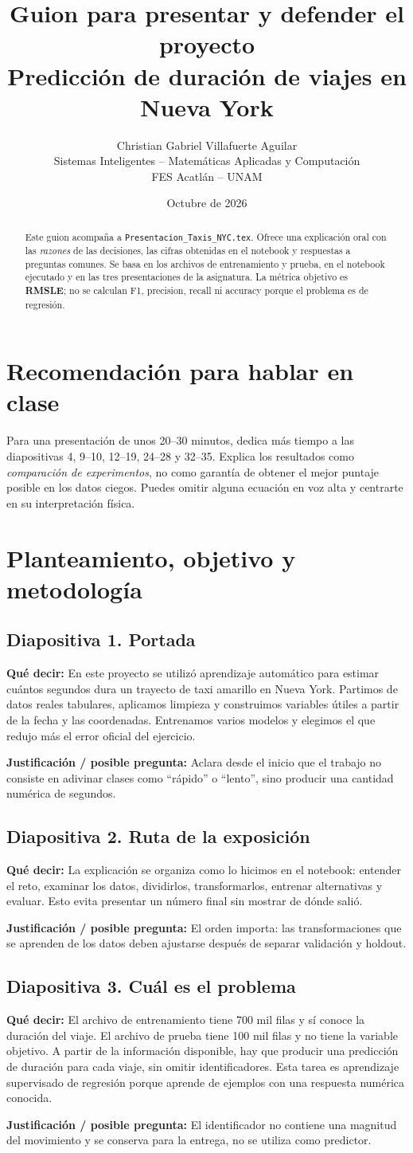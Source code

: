 \documentclass[11pt,letterpaper]{article}
\title{Guion para presentar y defender el proyecto\\[3mm]\large Predicción de duración de viajes en Nueva York}
\author{Christian Gabriel Villafuerte Aguilar\\Sistemas Inteligentes -- Matemáticas Aplicadas y Computación\\FES Acatlán -- UNAM}
\date{Octubre de 2026}
\newcommand{\lamina}[2]{\subsection*{Diapositiva #1. #2}}
\newcommand{\explica}[1]{\noindent\textcolor{azul}{\textbf{Qué decir:}} #1\par\smallskip}
\newcommand{\defiende}[1]{\noindent\textcolor{verde}{\textbf{Justificación / posible pregunta:}} #1\par\medskip}
\begin{document}
\maketitle
\begin{abstract}
Este guion acompaña a \texttt{Presentacion\_Taxis\_NYC.tex}. Ofrece una explicación oral con las \emph{razones} de las decisiones, las cifras obtenidas en el notebook y respuestas a preguntas comunes. Se basa en los archivos de entrenamiento y prueba, en el notebook ejecutado y en las tres presentaciones de la asignatura. La métrica objetivo es \textbf{RMSLE}; no se calculan F1, precision, recall ni accuracy porque el problema es de regresión.
\end{abstract}

\section*{Recomendación para hablar en clase}
Para una presentación de unos 20--30 minutos, dedica más tiempo a las diapositivas 4, 9--10, 12--19, 24--28 y 32--35. Explica los resultados como \emph{comparación de experimentos}, no como garantía de obtener el mejor puntaje posible en los datos ciegos. Puedes omitir alguna ecuación en voz alta y centrarte en su interpretación física.

\section{Planteamiento, objetivo y metodología}
\lamina{1}{Portada}
\explica{En este proyecto se utilizó aprendizaje automático para estimar cuántos segundos dura un trayecto de taxi amarillo en Nueva York. Partimos de datos reales tabulares, aplicamos limpieza y construimos variables útiles a partir de la fecha y las coordenadas. Entrenamos varios modelos y elegimos el que redujo más el error oficial del ejercicio.}
\defiende{Aclara desde el inicio que el trabajo no consiste en adivinar clases como ``rápido'' o ``lento'', sino producir una cantidad numérica de segundos.}

\lamina{2}{Ruta de la exposición}
\explica{La explicación se organiza como lo hicimos en el notebook: entender el reto, examinar los datos, dividirlos, transformarlos, entrenar alternativas y evaluar. Esto evita presentar un número final sin mostrar de dónde salió.}
\defiende{El orden importa: las transformaciones que se aprenden de los datos deben ajustarse después de separar validación y holdout.}

\lamina{3}{Cuál es el problema}
\explica{El archivo de entrenamiento tiene 700 mil filas y sí conoce la duración del viaje. El archivo de prueba tiene 100 mil filas y no tiene la variable objetivo. A partir de la información disponible, hay que producir una predicción de duración para cada viaje, sin omitir identificadores. Esta tarea es aprendizaje supervisado de regresión porque aprende de ejemplos con una respuesta numérica conocida.}
\defiende{El identificador no contiene una magnitud del movimiento y se conserva para la entrega, no se utiliza como predictor.}
\end{document}

